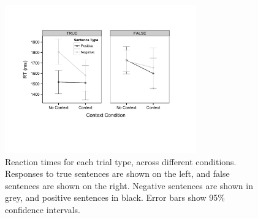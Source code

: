 \documentclass[10pt,letterpaper]{article}
\begin{document}

\begin{figure}
\begin{center} 
\includegraphics[width=3.25in]{figures/study1_linegraph.pdf}
\caption{\label{fig:e1line} Reaction times for each trial type, across different conditions.  Responses to true sentences are shown on the left, and false sentences are shown on the right.  Negative sentences are shown in grey, and positive sentences in black.  Error bars show 95\% confidence intervals.}
\end{center} 
\end{figure}
\end{document}
